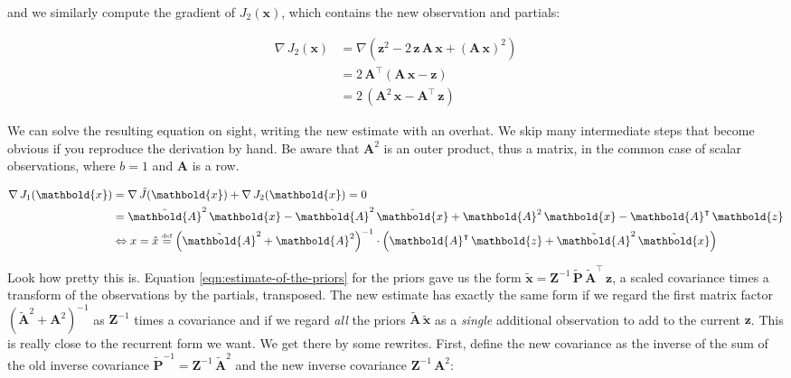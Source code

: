 \documentclass[10pt,oneside,x11names]{article}
\begin{document}
\noindent and we similarly compute the gradient of
\(J_2(\mathbold{x})\), which contains the new observation and partials:

\begin{align*}
\nabla\,
J_2(\mathbold{x})
&=
\nabla
\left(
\mathbold{z}^2 -
2\,
\mathbold{z}\,
\mathbold{A}\,
\mathbold{x} +
\left(
\mathbold{A}\,
\mathbold{x}
\right)^2
\right)
\\
&=
2\,
\mathbold{A}^\intercal
\left(
\mathbold{A}\,
\mathbold{x} -
\mathbold{z}
\right)
\\
&=
2\,
\left(
\mathbold{A}^2\,
\mathbold{x}-
\mathbold{A}^\intercal\,
\mathbold{z}
\right)
\end{align*}

\noindent We can solve the resulting equation on sight, writing the new estimate
with an overhat. We skip many
intermediate steps that become obvious if you reproduce the derivation by hand. Be
aware that \(\mathbold{A}^2\) is an outer product, thus a matrix, in the common
case of scalar observations, where \(b = 1\) and
\(\mathbold{A}\) is a row.

\begin{align*}
\nabla{}\,
J_1(\mathbold{x}) 
&= 
\nabla{}\,
{\tilde{J}}
(\mathbold{x}) + 
\nabla{}\,
J_2(\mathbold{x}) 
= 0
\\
&=
{\tilde{\mathbold{A}}}^2\,
\mathbold{x} -
{\tilde{\mathbold{A}}}^2\,
{\tilde{\mathbold{x}}} +
\mathbold{A}^2\,
\mathbold{x} - 
\mathbold{A}^\intercal{}\,
\mathbold{z}
\\
&
\Leftrightarrow
x=\hat{x}
\stackrel{\text{\tiny def}}{=}
\left(
{\tilde{\mathbold{A}}}^2 + 
\mathbold{A}^2
\right)^{-1}
\cdot
\left(
\mathbold{A}^\intercal\,
\mathbold{z} + 
{\tilde{\mathbold{A}}}^2\,
{\tilde{\mathbold{x}}}
\right)
\end{align*}

Look how pretty this is. Equation \ref{eqn:estimate-of-the-priors} for the
priors gave us the form
\(\tilde{\mathbold{x}}= \mathbold{Z}^{-1}\,\tilde{\mathbold{P}}\,
\tilde{\mathbold{A}}^\intercal\, \mathbold{z}\), a scaled covariance times a transform
of the observations by the partials, transposed. The new estimate has exactly
the same form if we regard the first matrix factor \(\left(
{\tilde{\mathbold{A}}}^2 + \mathbold{A}^2 \right)^{-1}\) as \(\mathbold{Z}^{-1}\) times a covariance and if
we regard \emph{all} the priors \({\tilde{\mathbold{A}}}\,{\tilde{\mathbold{x}}}\) as a \emph{single}
additional observation to add to the current \(\mathbold{z}\). This is really
close to the recurrent  form we want. We get there by some
rewrites. First, define the new covariance as the inverse of the sum of the
old inverse covariance
\({\tilde{\mathbold{P}}}^{-1}=
\mathbold{Z}^{-1}\,{\tilde{\mathbold{A}}}^{2}\)
and the new inverse covariance
\(\mathbold{Z}^{-1}\,{\mathbold{A}}^{2}\):
\end{document}
